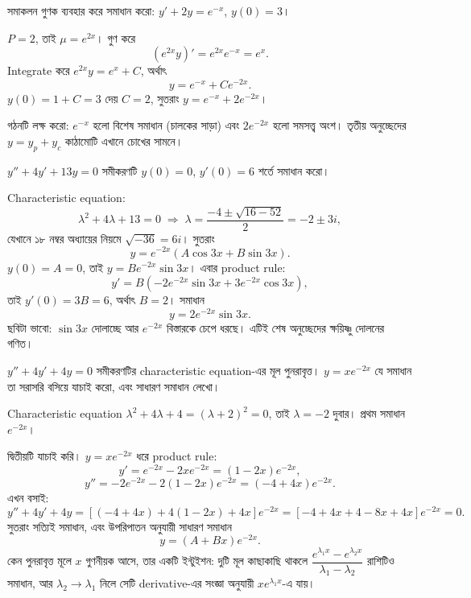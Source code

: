 \documentclass[11pt]{article}
\begin{document}
 সমাকলন গুণক ব্যবহার করে সমাধান করো: $y' + 2y = e^{-x}$, $y(0) = 3$।

\begin{sol}
$P = 2$, তাই $\mu = e^{2x}$। গুণ করে
\[
  \left( e^{2x}y \right)' = e^{2x}e^{-x} = e^{x} .
\]
Integrate করে $e^{2x}y = e^{x} + C$, অর্থাৎ
\[
  y = e^{-x} + Ce^{-2x} .
\]
$y(0) = 1 + C = 3$ দেয় $C = 2$, সুতরাং $y = e^{-x} + 2e^{-2x}$।

গঠনটি লক্ষ করো: $e^{-x}$ হলো বিশেষ সমাধান (চালকের সাড়া) এবং $2e^{-2x}$ হলো
সমসত্ত্ব অংশ। তৃতীয় অনুচ্ছেদের $y = y_{p} + y_{c}$ কাঠামোটি এখানে চোখের
সামনে।
\end{sol}

 $y'' + 4y' + 13y = 0$ সমীকরণটি $y(0) = 0$, $y'(0) = 6$ শর্তে সমাধান
করো।

\begin{sol}
Characteristic equation:
\[
  \lambda^{2} + 4\lambda + 13 = 0
  \;\Longrightarrow\; \lambda = \frac{-4 \pm \sqrt{16-52}}{2}
  = -2 \pm 3i ,
\]
যেখানে ১৮ নম্বর অধ্যায়ের নিয়মে $\sqrt{-36} = 6i$। সুতরাং
\[
  y = e^{-2x}\left( A\cos 3x + B\sin 3x \right) .
\]
$y(0) = A = 0$, তাই $y = Be^{-2x}\sin 3x$। এবার product rule:
\[
  y' = B\left( -2e^{-2x}\sin 3x + 3e^{-2x}\cos 3x \right) ,
\]
তাই $y'(0) = 3B = 6$, অর্থাৎ $B = 2$। সমাধান
\[
  y = 2e^{-2x}\sin 3x .
\]
ছবিটা ভাবো: $\sin 3x$ দোলাচ্ছে আর $e^{-2x}$ বিস্তারকে চেপে ধরছে। এটিই শেষ
অনুচ্ছেদের ক্ষয়িষ্ণু দোলনের গণিত।
\end{sol}

 $y'' + 4y' + 4y = 0$ সমীকরণটির characteristic equation-এর মূল
পুনরাবৃত্ত। $y = xe^{-2x}$ যে সমাধান তা সরাসরি বসিয়ে যাচাই করো, এবং সাধারণ
সমাধান লেখো।

\begin{sol}
Characteristic equation $\lambda^{2}+4\lambda+4 = (\lambda+2)^{2} = 0$, তাই
$\lambda = -2$ দুবার। প্রথম সমাধান $e^{-2x}$।

দ্বিতীয়টি যাচাই করি। $y = xe^{-2x}$ ধরে product rule:
\[
  y' = e^{-2x} - 2xe^{-2x} = (1-2x)e^{-2x} ,
\]
\[
  y'' = -2e^{-2x} - 2(1-2x)e^{-2x} = (-4+4x)e^{-2x} .
\]
এখন বসাই:
\[
  y'' + 4y' + 4y = \left[ (-4+4x) + 4(1-2x) + 4x \right]e^{-2x}
  = \left[ -4+4x+4-8x+4x \right]e^{-2x} = 0 .
\]
সুতরাং সত্যিই সমাধান, এবং উপরিপাতন অনুযায়ী সাধারণ সমাধান
\[
  y = \left( A + Bx \right)e^{-2x} .
\]
কেন পুনরাবৃত্ত মূলে $x$ গুণনীয়ক আসে, তার একটি ইন্টুইশন: দুটি মূল কাছাকাছি
থাকলে $\dfrac{e^{\lambda_{1}x} - e^{\lambda_{2}x}}{\lambda_{1}-\lambda_{2}}$
রাশিটিও সমাধান, আর $\lambda_{2} \to \lambda_{1}$ নিলে সেটি derivative-এর
সংজ্ঞা অনুযায়ী $xe^{\lambda_{1}x}$-এ যায়।
\end{sol}
\end{document}

